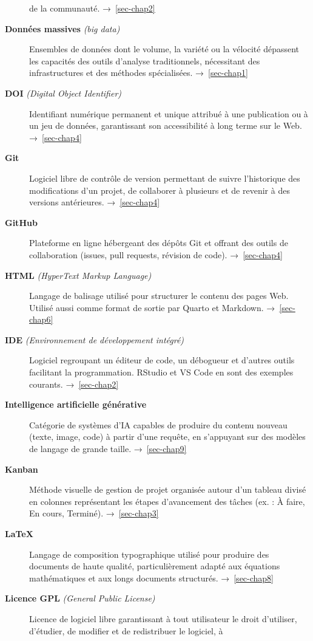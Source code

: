 \documentclass[
  letterpaper,
  DIV=11,
  numbers=noendperiod,
  oneside]{scrreprt}
\begin{document}
\begin{description}
de la communauté. →~\ref{sec-chap2}
\item[\textbf{Données massives} \emph{(big data)}]
Ensembles de données dont le volume, la variété ou la vélocité dépassent
les capacités des outils d'analyse traditionnels, nécessitant des
infrastructures et des méthodes spécialisées. →~\ref{sec-chap1}
\item[\textbf{DOI} \emph{(Digital Object Identifier)}]
Identifiant numérique permanent et unique attribué à une publication ou
à un jeu de données, garantissant son accessibilité à long terme sur le
Web. →~\ref{sec-chap4}
\item[\textbf{Git}]
Logiciel libre de contrôle de version permettant de suivre l'historique
des modifications d'un projet, de collaborer à plusieurs et de revenir à
des versions antérieures. →~\ref{sec-chap4}
\item[\textbf{GitHub}]
Plateforme en ligne hébergeant des dépôts Git et offrant des outils de
collaboration (issues, pull requests, révision de code).
→~\ref{sec-chap4}
\item[\textbf{HTML} \emph{(HyperText Markup Language)}]
Langage de balisage utilisé pour structurer le contenu des pages Web.
Utilisé aussi comme format de sortie par Quarto et Markdown.
→~\ref{sec-chap6}
\item[\textbf{IDE} \emph{(Environnement de développement intégré)}]
Logiciel regroupant un éditeur de code, un débogueur et d'autres outils
facilitant la programmation. RStudio et VS Code en sont des exemples
courants. →~\ref{sec-chap2}
\item[\textbf{Intelligence artificielle générative}]
Catégorie de systèmes d'IA capables de produire du contenu nouveau
(texte, image, code) à partir d'une requête, en s'appuyant sur des
modèles de langage de grande taille. →~\ref{sec-chap9}
\item[\textbf{Kanban}]
Méthode visuelle de gestion de projet organisée autour d'un tableau
divisé en colonnes représentant les étapes d'avancement des tâches (ex.
: À faire, En cours, Terminé). →~\ref{sec-chap3}
\item[\textbf{LaTeX}]
Langage de composition typographique utilisé pour produire des documents
de haute qualité, particulièrement adapté aux équations mathématiques et
aux longs documents structurés. →~\ref{sec-chap8}
\item[\textbf{Licence GPL} \emph{(General Public License)}]
Licence de logiciel libre garantissant à tout utilisateur le droit
d'utiliser, d'étudier, de modifier et de redistribuer le logiciel, à

\end{description}
\end{document}
